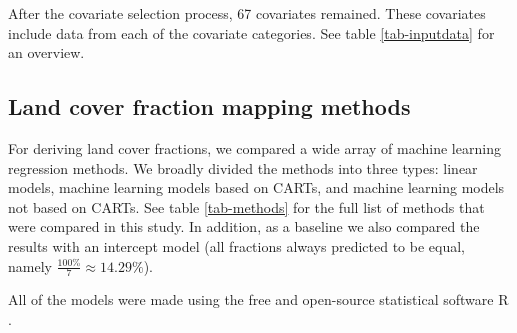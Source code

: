 \documentclass[review,authoryear,3p]{elsarticle}
\begin{document}
After the covariate selection process, 67 covariates remained.
These covariates include data from each of the covariate categories.
See table \ref{tab-inputdata} for an overview.


\subsection{Land cover fraction mapping methods}

For deriving land cover fractions, we compared a wide array of machine learning regression methods.
We broadly divided the methods into three types: linear models, machine learning models based on \glspl{CART}, and machine learning models not based on \glspl{CART}.
See table \ref{tab-methods} for the full list of methods that were compared in this study.
In addition, as a baseline we also compared the results with an intercept model (all fractions always predicted to be equal, namely $\frac{100\%}{7}\approx14.29\%$).

All of the models were made using the free and open-source statistical software R \citep{r_2019}.
\end{document}
